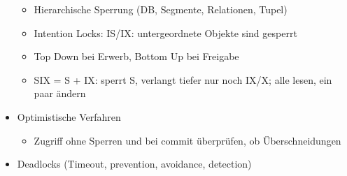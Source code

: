 \documentclass[11pt, paper=a4, twocolumn]{scrartcl}
\begin{document}
\begin{itemize}
\begin{itemize}
					\item Hierarchische Sperrung (DB, Segmente, 
						Relationen, Tupel)
					\item Intention Locks: IS/IX: untergeordnete 
						Objekte sind gesperrt
					\item Top Down bei Erwerb, Bottom Up bei 
						Freigabe
					\item SIX = S + IX: sperrt S, verlangt tiefer nur 
						noch IX/X; alle lesen, ein paar ändern
				\end{itemize}
			\item Optimistische Verfahren
				\begin{itemize}
					\item Zugriff ohne Sperren und bei commit 
						überprüfen, ob Überschneidungen
				\end{itemize}
			\item Deadlocks (Timeout, prevention, avoidance, detection)
		\end{itemize}
	
\end{document}
